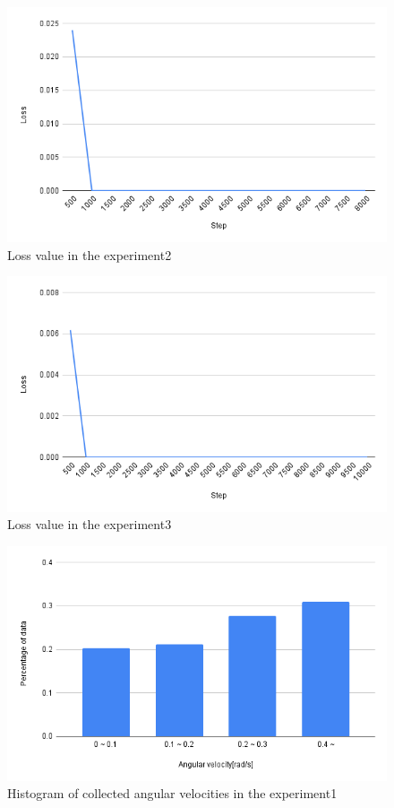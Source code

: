\begin{figure}[h]
  \centering
  \includegraphics[keepaspectratio, scale=0.31]{images/exp1-8000.png}
  \caption{Loss value in the experiment2}
  \label{Fig:exp1-8000}
  \end{figure}

\begin{figure}[h]
  \centering
  \includegraphics[keepaspectratio, scale=0.31]{images/exp1-10000.png}
  \caption{Loss value in the experiment3}
  \label{Fig:exp1-10000}
  \end{figure}

\begin{figure}[h]
  \centering
  \includegraphics[keepaspectratio, scale=0.4]{images/exp1.png}
  \caption{Histogram of collected angular velocities in the experiment1}
  \label{Fig:exp1}
  \end{figure}

